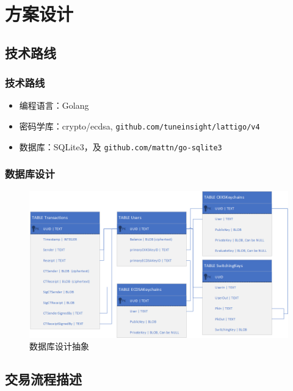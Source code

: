 \section{方案设计}

\subsection{技术路线}

\begin{frame}
    \frametitle{技术路线}

    \begin{itemize}
        \item 编程语言：Golang
        \item 密码学库：crypto/ecdsa, \texttt{github.com/tuneinsight/lattigo/v4}
        \item 数据库：SQLite3，及 \texttt{github.com/mattn/go-sqlite3}
    \end{itemize}

\end{frame}

\begin{frame}
    \frametitle{数据库设计}

    \begin{figure}[h]
        \centering
        \includegraphics[width=0.8\linewidth]{figures/chimata-database-design.png}
        \caption{数据库设计抽象}
    \end{figure}

\end{frame}

\subsection{交易流程描述}

